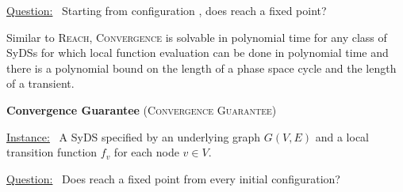 \noindent
\underline{\textsf{Question:}}~ Starting from configuration \calc,
does  \cals{} reach a fixed point? 

Similar to \textsc{Reach}, \textsc{Convergence} is
solvable in polynomial time for any class of SyDSs for which local function
evaluation can be done in polynomial time and there is a polynomial
bound on the length of a phase space cycle and the length of a
transient.  


\smallskip
\noindent
\textbf{Convergence Guarantee} (\textsc{Convergence Guarantee})

\smallskip
\noindent
\underline{\textsf{Instance:}}~ A SyDS \cals{} specified 
by an underlying
graph $G(V,E)$ and a local transition function $f_v$ for each node $v \in V$. 

\noindent
\underline{\textsf{Question:}}~ Does \cals{} reach a fixed point from
every initial configuration?
